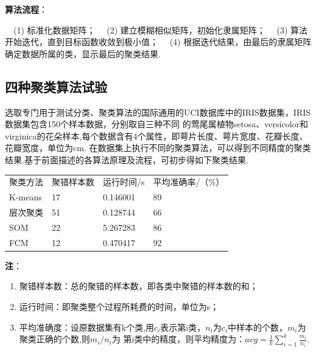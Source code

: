 \textbf{算法流程}：

　(1) 标准化数据矩阵； 　(2) 建立模糊相似矩阵，初始化隶属矩阵； 　(3)
算法开始迭代，直到目标函数收敛到极小值； 　(4)
根据迭代结果，由最后的隶属矩阵确定数据所属的类，显示最后的聚类结果.

\subsection{四种聚类算法试验}\label{ux56dbux79cdux805aux7c7bux7b97ux6cd5ux8bd5ux9a8c}

​
选取专门用于测试分类、聚类算法的国际通用的UCI数据库中的IRIS数据集，IRIS数据集包含150个样本数据，分别取自三种不同
的莺尾属植物setosa、versicolor和virginica的花朵样本,每个数据含有4个属性，即萼片长度、萼片宽度、花瓣长度、花瓣宽度，单位为cm.
在数据集上执行不同的聚类算法，可以得到不同精度的聚类结果.基于前面描述的各算法原理及流程，可初步得如下聚类结果.

\begin{longtable}[]{ llll }
聚类方法 & 聚错样本数 & 运行时间/s & 平均准确率/（\%）\tabularnewline
K-means & 17 & 0.146001 & 89\tabularnewline
层次聚类 & 51 & 0.128744 & 66\tabularnewline
SOM & 22 & 5.267283 & 86\tabularnewline
FCM & 12 & 0.470417 & 92\tabularnewline
\end{longtable}

\textbf{注}：

\begin{enumerate}
\def\labelenumi{(\arabic{enumi})}
\item
  聚错样本数：总的聚错的样本数，即各类中聚错的样本数的和；\\
\item
  运行时间：即聚类整个过程所耗费的时间，单位为s；\\
\item
  平均准确度：设原数据集有k个类,用$c_i$表示第i类，$n_i$为$c_i$中样本的个数，$m_i$为聚类正确的个数,则$m_i/n_i$为
  第i类中的精度，则平均精度为：$avg=\frac{1}{k}\sum_{i=1}^{k}\frac{m_{i}}{n_{i}}$.
\end{enumerate}



